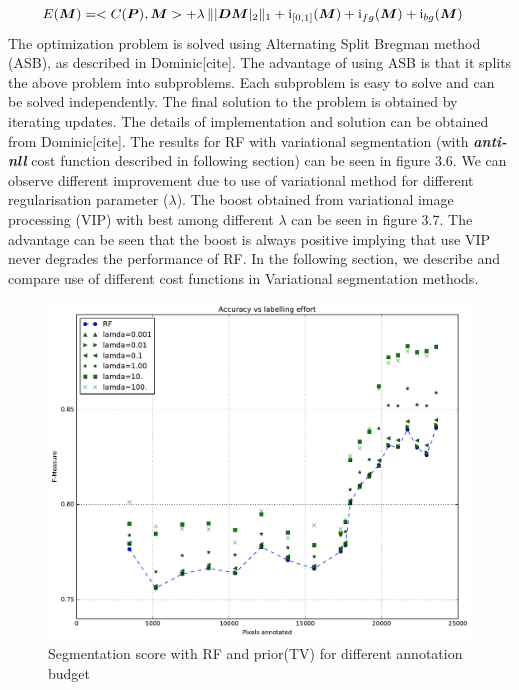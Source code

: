 \begin{align*}
\mathop{{}E}(\boldsymbol{M}) &= <\mathop{{}C}(\boldsymbol{P}), \boldsymbol{M}> + \lambda\, \||\boldsymbol{D}\boldsymbol{M}|_2\|_1 + \mathrm{i}_{[0,1]}(\boldsymbol{M}) + \mathrm{i}_{fg}(\boldsymbol{M})  + \mathrm{i}_{bg}(\boldsymbol{M}) 
\end{align*}
The optimization problem is solved using Alternating Split Bregman method (ASB), as described in Dominic[cite]. The advantage of using ASB is that it splits the above problem into subproblems. Each subproblem is easy to solve and can be solved independently. The final solution to the problem is obtained by iterating updates. The details of implementation and solution can be obtained from Dominic[cite]. The results for RF with variational segmentation (with \textbf{\textit{anti-nll}} cost function described in following section) can be seen in figure 3.6. We can observe different improvement due to use of variational method for different regularisation parameter ($\lambda$). The boost obtained from variational image processing (VIP) with best among different $\lambda$ can be seen in figure 3.7. The advantage can be seen that the boost is always positive implying that use VIP never degrades the performance of RF. In the following section, we describe and compare use of different cost functions in Variational segmentation methods.

\begin{figure}[h!] \label{fig:rf_vip}
 \includegraphics[width=0.8\linewidth]{figures/rf_vip_easy_then_hard.pdf}
\caption{Segmentation score with RF and prior(TV) for different annotation budget}
\end{figure}


